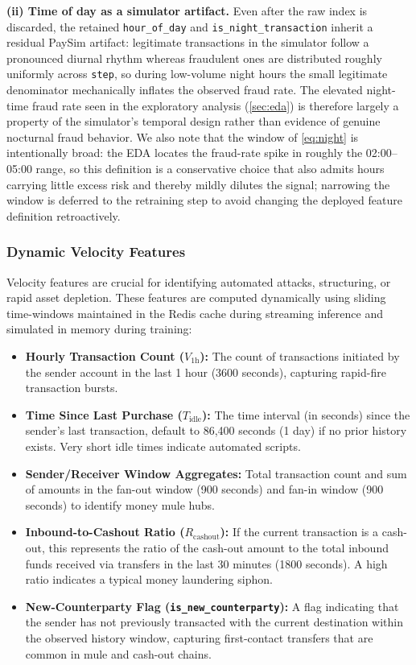 \noindent\textbf{(ii) Time of day as a simulator artifact.} Even after the raw index is discarded, the retained \texttt{hour\_of\_day} and \texttt{is\_night\_transaction} inherit a residual PaySim artifact: legitimate transactions in the simulator follow a pronounced diurnal rhythm whereas fraudulent ones are distributed roughly uniformly across \texttt{step}, so during low-volume night hours the small legitimate denominator mechanically inflates the observed fraud rate. The elevated night-time fraud rate seen in the exploratory analysis (\cref{sec:eda}) is therefore largely a property of the simulator's temporal design rather than evidence of genuine nocturnal fraud behavior. We also note that the window of \cref{eq:night} is intentionally broad: the EDA locates the fraud-rate spike in roughly the 02:00--05:00 range, so this definition is a conservative choice that also admits hours carrying little excess risk and thereby mildly dilutes the signal; narrowing the window is deferred to the retraining step to avoid changing the deployed feature definition retroactively.

\subsubsection{Dynamic Velocity Features}
Velocity features are crucial for identifying automated attacks, structuring, or rapid asset depletion. These features are computed dynamically using sliding time-windows maintained in the Redis cache during streaming inference and simulated in memory during training:
\begin{itemize}
    \item \textbf{Hourly Transaction Count ($V_{1\text{h}}$):} The count of transactions initiated by the sender account in the last 1 hour (3600 seconds), capturing rapid-fire transaction bursts.
    \item \textbf{Time Since Last Purchase ($T_{\text{idle}}$):} The time interval (in seconds) since the sender's last transaction, default to 86,400 seconds (1 day) if no prior history exists. Very short idle times indicate automated scripts.
    \item \textbf{Sender/Receiver Window Aggregates:} Total transaction count and sum of amounts in the fan-out window (900 seconds) and fan-in window (900 seconds) to identify money mule hubs.
    \item \textbf{Inbound-to-Cashout Ratio ($R_{\text{cashout}}$):} If the current transaction is a cash-out, this represents the ratio of the cash-out amount to the total inbound funds received via transfers in the last 30 minutes (1800 seconds). A high ratio indicates a typical money laundering siphon.
    \item \textbf{New-Counterparty Flag (\texttt{is\_new\_counterparty}):} A flag indicating that the sender has not previously transacted with the current destination within the observed history window, capturing first-contact transfers that are common in mule and cash-out chains.
\end{itemize}

